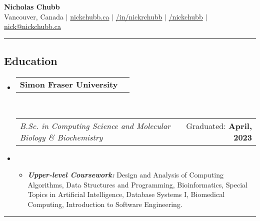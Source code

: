 \documentclass[10pt,a4paper]{article}
\makeatletter
\newcommand{\headerrow}[2]
{\begin{tabular*}{\linewidth}{l@{\extracolsep{\fill}}r}
	#1 &
	#2 \\
\end{tabular*}}
\makeatother
\begin{document}
 

\begin{center}

{\Huge \textbf{Nicholas Chubb}} \\
\vspace{1em}
{\small
{{ }\faHome { }Vancouver, Canada} $|$ 
{{ }\faGlobe { } \href{https://nickchubb.ca/}{nickchubb.ca}} $|$ 
{{ }\faLinkedinSquare { } \href{https://linkedin.com/in/nickrchubb}{/in/nickrchubb}} $|$ 
{{ }\faGithub { } \href{https://github.com/NickChubb}{/nickchubb}} $|$ 
{{ }\faEnvelope { } \href{mailto:nick@nickchubb.ca}{nick@nickchubb.ca}}\\ \vspace{.2em}
}
\end{center}

\hrule
\vspace{-0.5em}

\subsection*{Education}

\vspace{-0.2em}

\begin{itemize}[leftmargin=0em]

	\parskip=0.1em

	\item[] 
	\headerrow
		{\textbf{Simon Fraser University}}
        {}
	\\
	\headerrow
		{\textit{B.Sc. in Computing Science and Molecular Biology \& Biochemistry}}
		{\small{{Graduated:} \textbf{April, 2023}}}
		
	\item[]
	\begin{itemize}
	\item 
	{ \small
	\textbf{\textit{Upper-level Coursework: }}Design and Analysis of Computing Algorithms, Data Structures and Programming, Bioinformatics, Special Topics in Artificial Intelligence, Database Systems I, Biomedical Computing, Introduction to Software Engineering.
	}
	\end{itemize}
	

\end{itemize}

\vspace{0.2em}
\hrule %
\vspace{-0.4em}
\end{document}
